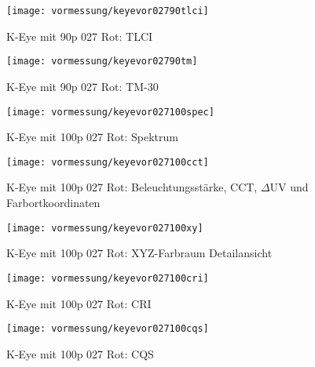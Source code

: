 \documentclass[pagesize,paper=A4,fontsize=12pt,utf8,numbers=noenddot,bibliography=totoc,listof=totoc,DIV=11,BCOR=1mm]{scrreprt}
\begin{document}
\begin{figure}[htp]     %
\centering
\texttt{[image: vormessung/keyevor02790tlci]} 
\caption {K-Eye mit 90p 027 Rot: TLCI} 
\end{figure}

\begin{figure}[htp]     %
\centering
\texttt{[image: vormessung/keyevor02790tm]} 
\caption {K-Eye mit 90p 027 Rot: TM-30} 
\end{figure}




\begin{figure}[htp]     %
\centering
\texttt{[image: vormessung/keyevor027100spec]} 
\caption {K-Eye mit 100p 027 Rot: Spektrum} 
\end{figure}

\begin{figure}[htp]     %
\centering
\texttt{[image: vormessung/keyevor027100cct]} 
\caption {K-Eye mit 100p 027 Rot: Beleuchtungsstärke, CCT, $\Delta$UV und Farbortkoordinaten} 
\end{figure}

\begin{figure}[htp]     %
\centering
\texttt{[image: vormessung/keyevor027100xy]} 
\caption {K-Eye mit 100p 027 Rot: XYZ-Farbraum Detailansicht} 
\end{figure}

\begin{figure}[htp]     %
\centering
\texttt{[image: vormessung/keyevor027100cri]} 
\caption {K-Eye mit 100p 027 Rot: CRI} 
\end{figure}

\begin{figure}[htp]     %
\centering
\texttt{[image: vormessung/keyevor027100cqs]} 
\caption {K-Eye mit 100p 027 Rot: CQS} 
\end{figure}
\end{document}
